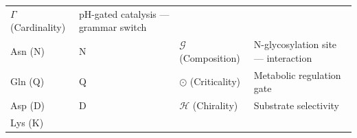 \documentclass[12pt,a4paper]{article}
\begin{document}
\begin{longtable}[]{@{}llll@{}}
\begin{minipage}[t]{0.36\columnwidth}
\(\Gamma\) (Cardinality)\strut
\end{minipage} & \begin{minipage}[t]{0.15\columnwidth}\raggedright
pH-gated catalysis --- grammar switch\strut
\end{minipage}\tabularnewline
\begin{minipage}[t]{0.20\columnwidth}\raggedright
Asn (N)\strut
\end{minipage} & \begin{minipage}[t]{0.17\columnwidth}\raggedright
N\strut
\end{minipage} & \begin{minipage}[t]{0.36\columnwidth}\raggedright
\(\mathcal{G}\) (Composition)\strut
\end{minipage} & \begin{minipage}[t]{0.15\columnwidth}\raggedright
N-glycosylation site --- interaction\strut
\end{minipage}\tabularnewline
\begin{minipage}[t]{0.20\columnwidth}\raggedright
Gln (Q)\strut
\end{minipage} & \begin{minipage}[t]{0.17\columnwidth}\raggedright
Q\strut
\end{minipage} & \begin{minipage}[t]{0.36\columnwidth}\raggedright
\(\odot\) (Criticality)\strut
\end{minipage} & \begin{minipage}[t]{0.15\columnwidth}\raggedright
Metabolic regulation gate\strut
\end{minipage}\tabularnewline
\begin{minipage}[t]{0.20\columnwidth}\raggedright
Asp (D)\strut
\end{minipage} & \begin{minipage}[t]{0.17\columnwidth}\raggedright
D\strut
\end{minipage} & \begin{minipage}[t]{0.36\columnwidth}\raggedright
\(\mathcal{H}\) (Chirality)\strut
\end{minipage} & \begin{minipage}[t]{0.15\columnwidth}\raggedright
Substrate selectivity\strut
\end{minipage}\tabularnewline
\begin{minipage}[t]{0.20\columnwidth}\raggedright
Lys (K)\strut
\end{minipage} & \begin{minipage}[t]{0.17\columnwidth}\raggedright

\end{minipage}
\end{longtable}
\end{document}
